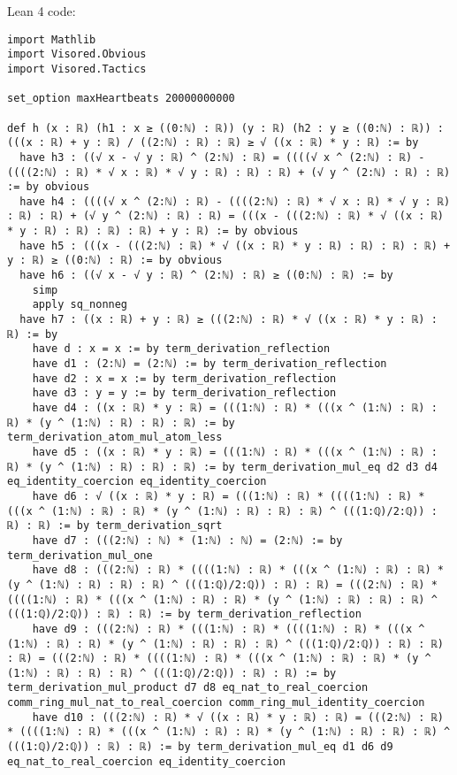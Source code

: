 \documentclass{article}
\begin{document}
Lean 4 code:
\begin{tcolorbox}[colback=white!10, width=\linewidth]
\begin{lstlisting}[language=Lean4]
import Mathlib
import Visored.Obvious
import Visored.Tactics

set_option maxHeartbeats 20000000000

def h (x : ℝ) (h1 : x ≥ ((0:ℕ) : ℝ)) (y : ℝ) (h2 : y ≥ ((0:ℕ) : ℝ)) : (((x : ℝ) + y : ℝ) / ((2:ℕ) : ℝ) : ℝ) ≥ √ ((x : ℝ) * y : ℝ) := by
  have h3 : ((√ x - √ y : ℝ) ^ (2:ℕ) : ℝ) = ((((√ x ^ (2:ℕ) : ℝ) - ((((2:ℕ) : ℝ) * √ x : ℝ) * √ y : ℝ) : ℝ) : ℝ) + (√ y ^ (2:ℕ) : ℝ) : ℝ) := by obvious
  have h4 : ((((√ x ^ (2:ℕ) : ℝ) - ((((2:ℕ) : ℝ) * √ x : ℝ) * √ y : ℝ) : ℝ) : ℝ) + (√ y ^ (2:ℕ) : ℝ) : ℝ) = (((x - (((2:ℕ) : ℝ) * √ ((x : ℝ) * y : ℝ) : ℝ) : ℝ) : ℝ) + y : ℝ) := by obvious
  have h5 : (((x - (((2:ℕ) : ℝ) * √ ((x : ℝ) * y : ℝ) : ℝ) : ℝ) : ℝ) + y : ℝ) ≥ ((0:ℕ) : ℝ) := by obvious
  have h6 : ((√ x - √ y : ℝ) ^ (2:ℕ) : ℝ) ≥ ((0:ℕ) : ℝ) := by
    simp
    apply sq_nonneg
  have h7 : ((x : ℝ) + y : ℝ) ≥ (((2:ℕ) : ℝ) * √ ((x : ℝ) * y : ℝ) : ℝ) := by
    have d : x = x := by term_derivation_reflection
    have d1 : (2:ℕ) = (2:ℕ) := by term_derivation_reflection
    have d2 : x = x := by term_derivation_reflection
    have d3 : y = y := by term_derivation_reflection
    have d4 : ((x : ℝ) * y : ℝ) = (((1:ℕ) : ℝ) * (((x ^ (1:ℕ) : ℝ) : ℝ) * (y ^ (1:ℕ) : ℝ) : ℝ) : ℝ) := by term_derivation_atom_mul_atom_less
    have d5 : ((x : ℝ) * y : ℝ) = (((1:ℕ) : ℝ) * (((x ^ (1:ℕ) : ℝ) : ℝ) * (y ^ (1:ℕ) : ℝ) : ℝ) : ℝ) := by term_derivation_mul_eq d2 d3 d4 eq_identity_coercion eq_identity_coercion
    have d6 : √ ((x : ℝ) * y : ℝ) = (((1:ℕ) : ℝ) * ((((1:ℕ) : ℝ) * (((x ^ (1:ℕ) : ℝ) : ℝ) * (y ^ (1:ℕ) : ℝ) : ℝ) : ℝ) ^ (((1:ℚ)/2:ℚ)) : ℝ) : ℝ) := by term_derivation_sqrt
    have d7 : (((2:ℕ) : ℕ) * (1:ℕ) : ℕ) = (2:ℕ) := by term_derivation_mul_one
    have d8 : (((2:ℕ) : ℝ) * ((((1:ℕ) : ℝ) * (((x ^ (1:ℕ) : ℝ) : ℝ) * (y ^ (1:ℕ) : ℝ) : ℝ) : ℝ) ^ (((1:ℚ)/2:ℚ)) : ℝ) : ℝ) = (((2:ℕ) : ℝ) * ((((1:ℕ) : ℝ) * (((x ^ (1:ℕ) : ℝ) : ℝ) * (y ^ (1:ℕ) : ℝ) : ℝ) : ℝ) ^ (((1:ℚ)/2:ℚ)) : ℝ) : ℝ) := by term_derivation_reflection
    have d9 : (((2:ℕ) : ℝ) * (((1:ℕ) : ℝ) * ((((1:ℕ) : ℝ) * (((x ^ (1:ℕ) : ℝ) : ℝ) * (y ^ (1:ℕ) : ℝ) : ℝ) : ℝ) ^ (((1:ℚ)/2:ℚ)) : ℝ) : ℝ) : ℝ) = (((2:ℕ) : ℝ) * ((((1:ℕ) : ℝ) * (((x ^ (1:ℕ) : ℝ) : ℝ) * (y ^ (1:ℕ) : ℝ) : ℝ) : ℝ) ^ (((1:ℚ)/2:ℚ)) : ℝ) : ℝ) := by term_derivation_mul_product d7 d8 eq_nat_to_real_coercion comm_ring_mul_nat_to_real_coercion comm_ring_mul_identity_coercion
    have d10 : (((2:ℕ) : ℝ) * √ ((x : ℝ) * y : ℝ) : ℝ) = (((2:ℕ) : ℝ) * ((((1:ℕ) : ℝ) * (((x ^ (1:ℕ) : ℝ) : ℝ) * (y ^ (1:ℕ) : ℝ) : ℝ) : ℝ) ^ (((1:ℚ)/2:ℚ)) : ℝ) : ℝ) := by term_derivation_mul_eq d1 d6 d9 eq_nat_to_real_coercion eq_identity_coercion

\end{lstlisting}
\end{tcolorbox}
\end{document}
